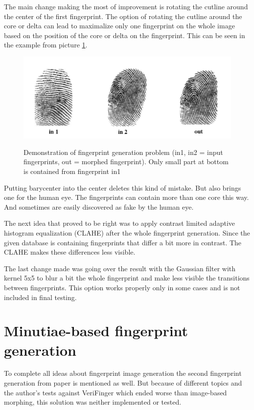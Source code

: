The main change making the most of improvement is rotating the cutline around the center of the first fingerprint. The option of rotating the cutline around the core or delta can lead to maximalize only one fingerprint on the whole image based on the position of the core or delta on the fingerprint. This can be seen in the example from picture \ref{fig:bad_show}.

\begin{figure}[H]
    \centering
        {\includegraphics[width=1\linewidth]{obrazky-figures/bad_show.png}}\\
        \caption{Demonstration of fingerprint generation problem (in1, in2 = input fingerprints, out = morphed fingerprint). Only small part at bottom is contained from fingerprint in1}
        \label{fig:bad_show}
\end{figure}

Putting barycenter into the center deletes this kind of mistake. But also brings one for the human eye. The fingerprints can contain more than one core this way. And sometimes are easily discovered as fake by the human eye.

The next idea that proved to be right was to apply contrast limited adaptive histogram equalization (CLAHE) after the whole fingerprint generation. Since the given database is containing fingerprints that differ a bit more in contrast. The CLAHE makes these differences less visible.

The last change made was going over the result with the Gaussian filter with kernel 5x5 to blur a bit the whole fingerprint and make less visible the transitions between fingerprints. This option works properly only in some cases and is not included in final testing.

\section{Minutiae-based fingerprint generation}
To complete all ideas about fingerprint image generation the second fingerprint generation from paper \cite{morphing_paper} is mentioned as well. But because of different topics and the author’s tests against VeriFinger which ended worse than image-based morphing, this solution was neither implemented or tested. 

